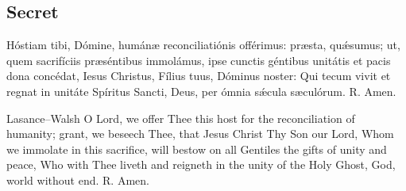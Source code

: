 \subsection{Secret}
\label{proper-secret}
\begin{latinproper}
Hóstiam tibi, Dómine, humánæ reconciliatiónis offérimus: præsta, quǽsumus; ut, quem sacrifíciis præséntibus immolámus, ipse cunctis géntibus unitátis et pacis dona concédat, Iesus Christus, Fílius tuus, Dóminus noster: Qui tecum vivit et regnat in unitáte Spíritus Sancti, Deus, per ómnia sǽcula sæculórum. \textnormal{R.} Amen.
\end{latinproper}
\begin{englishwitness}{Lasance--Walsh}
O Lord, we offer Thee this host for the reconciliation of humanity; grant, we beseech Thee, that Jesus Christ Thy Son our Lord, Whom we immolate in this sacrifice, will bestow on all Gentiles the gifts of unity and peace, Who with Thee liveth and reigneth in the unity of the Holy Ghost, God, world without end. \textnormal{R.} Amen.
\end{englishwitness}

